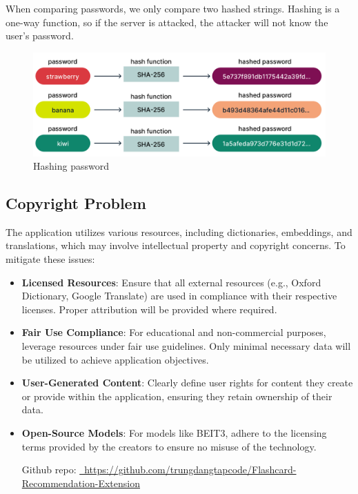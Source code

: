 \documentclass{article}
\begin{document}
\begin{itemize}
When comparing passwords, we only compare two hashed strings. Hashing is a one-way function, so if the server is attacked, the attacker will not know the user's password.
\begin{figure}[H]
    \centering
    \includegraphics[width=0.75\linewidth]{hash.png}
    \caption{Hashing password}
    \label{fig:enter-label}
\end{figure}
\end{itemize}
\subsection{Copyright Problem}

The application utilizes various resources, including dictionaries, embeddings, and translations, which may involve intellectual property and copyright concerns. To mitigate these issues:
\begin{itemize}
\item 
\textbf{Licensed Resources}: Ensure that all external resources (e.g., Oxford Dictionary, Google Translate) are used in compliance with their respective licenses. Proper attribution will be provided where required.
\item 
\textbf{Fair Use Compliance}: For educational and non-commercial purposes, leverage resources under fair use guidelines. Only minimal necessary data will be utilized to achieve application objectives.
\item 
\textbf{User-Generated Content}: Clearly define user rights for content they create or provide within the application, ensuring they retain ownership of their data.
\item 
\textbf{Open-Source Models}: For models like BEIT3, adhere to the licensing terms provided by the creators to ensure no misuse of the technology.

Github repo: \href{https://github.com/trungdangtapcode/Flashcard-Recommendation-Extension}{\faGithub\ https://github.com/trungdangtapcode/Flashcard-Recommendation-Extension}




\end{itemize}
\end{document}
